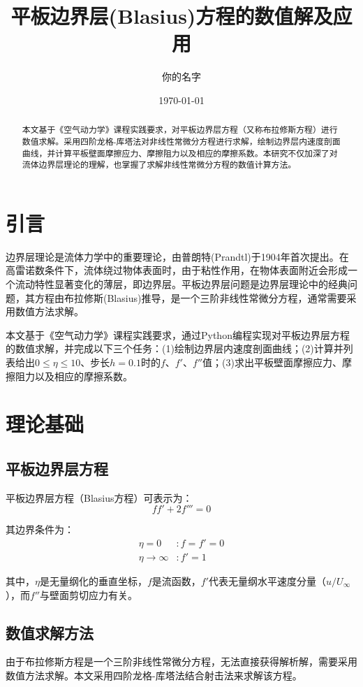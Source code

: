 \documentclass[12pt,a4paper]{article}
\title{平板边界层(Blasius)方程的数值解及应用}
\author{你的名字}
\date{\today}
\begin{document}
\maketitle

\begin{abstract}
本文基于《空气动力学》课程实践要求，对平板边界层方程（又称布拉修斯方程）进行数值求解。采用四阶龙格-库塔法对非线性常微分方程进行求解，绘制边界层内速度剖面曲线，并计算平板壁面摩擦应力、摩擦阻力以及相应的摩擦系数。本研究不仅加深了对流体边界层理论的理解，也掌握了求解非线性常微分方程的数值计算方法。
\end{abstract}

\section{引言}
边界层理论是流体力学中的重要理论，由普朗特(Prandtl)于1904年首次提出。在高雷诺数条件下，流体绕过物体表面时，由于粘性作用，在物体表面附近会形成一个流动特性显著变化的薄层，即边界层。平板边界层问题是边界层理论中的经典问题，其方程由布拉修斯(Blasius)推导，是一个三阶非线性常微分方程，通常需要采用数值方法求解。

本文基于《空气动力学》课程实践要求，通过Python编程实现对平板边界层方程的数值求解，并完成以下三个任务：(1)绘制边界层内速度剖面曲线；(2)计算并列表给出$0 \leq \eta \leq 10$、步长$h = 0.1$时的$f$、$f'$、$f''$值；(3)求出平板壁面摩擦应力、摩擦阻力以及相应的摩擦系数。

\section{理论基础}
\subsection{平板边界层方程}
平板边界层方程（Blasius方程）可表示为：
\begin{equation}
ff' + 2f''' = 0
\end{equation}

其边界条件为：
\begin{align}
\eta = 0 &: f = f' = 0 \\
\eta \to \infty &: f' = 1
\end{align}

\begin{sloppypar}
其中，$\eta$是无量纲化的垂直坐标，$f$是流函数，$f'$代表无量纲水平速度分量（$u/U_\infty$），而$f''$与壁面剪切应力有关。
\end{sloppypar}

\subsection{数值求解方法}
由于布拉修斯方程是一个三阶非线性常微分方程，无法直接获得解析解，需要采用数值方法求解。本文采用四阶龙格-库塔法结合射击法来求解该方程。
\end{document}

